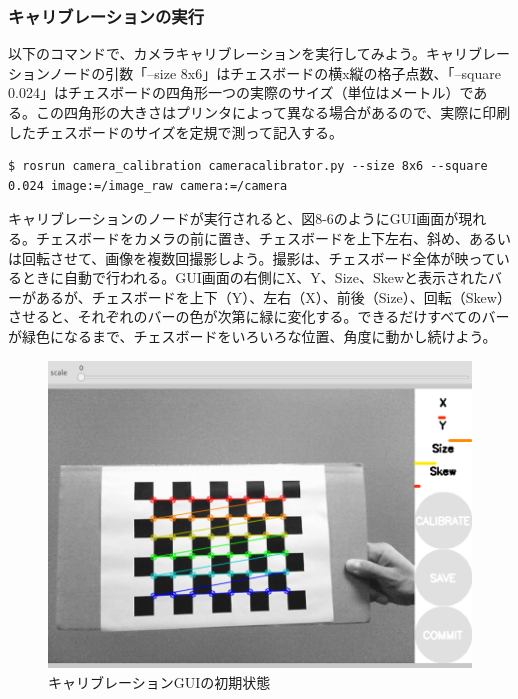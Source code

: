 \subsubsection{キャリブレーションの実行}

以下のコマンドで、カメラキャリブレーションを実行してみよう。キャリブレーションノードの引数「--size 8x6」はチェスボードの横x縦の格子点数、「--square 0.024」はチェスボードの四角形一つの実際のサイズ（単位はメートル）である。この四角形の大きさはプリンタによって異なる場合があるので、実際に印刷したチェスボードのサイズを定規で測って記入する。

\begin{lstlisting}[language=ROS]
$ rosrun camera_calibration cameracalibrator.py --size 8x6 --square 0.024 image:=/image_raw camera:=/camera
\end{lstlisting}

キャリブレーションのノードが実行されると、図8-6のようにGUI画面が現れる。チェスボードをカメラの前に置き、チェスボードを上下左右、斜め、あるいは回転させて、画像を複数回撮影しよう。撮影は、チェスボード全体が映っているときに自動で行われる。GUI画面の右側にX、Y、Size、Skewと表示されたバーがあるが、チェスボードを上下（Y）、左右（X）、前後（Size）、回転（Skew）させると、それぞれのバーの色が次第に緑に変化する。できるだけすべてのバーが緑色になるまで、チェスボードをいろいろな位置、角度に動かし続けよう。

\begin{figure}[ht]
  \centering
  \includegraphics[width=\columnwidth]{pictures/chapter8/pic_08_06.png}
  \caption{キャリブレーションGUIの初期状態}
\end{figure}

